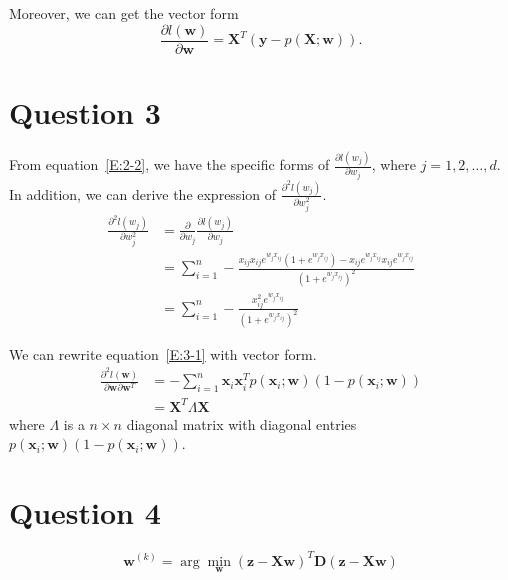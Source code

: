 \documentclass{article}
\newcommand{\vecw}{\mathbf{w}}
\newcommand{\vecx}{\mathbf{x}}
\newcommand{\vecy}{\mathbf{y}}
\newcommand{\vecz}{\mathbf{z}}
\newcommand{\matx}{\mathbf{X}}
\newcommand{\matd}{\mathbf{D}}
\newcommand{\partialdd}[2]{\frac{\partial #1}{\partial #2}}
\begin{document}
Moreover, we can get the vector form
\begin{equation}\label{E:2-3}
    \partialdd{l(\vecw)}{\vecw} = \matx^T\left(\vecy-p(\matx;\vecw)\right).
\end{equation}


\section{Question 3}\label{S:3}
From equation~\eqref{E:2-2}, we have the specific forms of $\partialdd{l(w_j)}{w_j}$, where $j=1,2,\ldots,d$. In addition, we can derive the expression of $\partialdd{^2l(w_j)}{w_j^2}$.
\begin{equation}\label{E:3-1}
    \begin{aligned}
        \partialdd{^2l(w_j)}{w_j^2} &= \partialdd{}{w_j}\partialdd{l(w_j)}{w_j} \\
                                    &= \sum_{i=1}^n-\frac{x_{ij}x_{ij}e^{w_jx_{ij}}\left(1+e^{w_jx_{ij}}\right)-x_{ij}e^{w_jx_{ij}}x_{ij}e^{w_jx_{ij}}}{\left(1+e^{w_jx_{ij}}\right)^2} \\
                                    &= \sum_{i=1}^n-\frac{x_{ij}^2e^{w_jx_{ij}}}{\left(1+e^{w_jx_{ij}}\right)^2}
    \end{aligned}
\end{equation}

We can rewrite equation~\eqref{E:3-1} with vector form.
\begin{equation}\label{E:3-2}
    \begin{aligned}
        \partialdd{^2l(\vecw)}{\vecw\partial\vecw^T} &= -\sum_{i=1}^n\vecx_i\vecx_i^Tp\left(\vecx_i;\vecw\right)\left(1-p(\vecx_i;\vecw)\right) \\
                                                     &= \matx^T\Lambda\matx
    \end{aligned}
\end{equation}
where $\Lambda$ is a $n\times n$ diagonal matrix with diagonal entries $p\left(\vecx_i;\vecw\right)\left(1-p(\vecx_i;\vecw)\right)$.


\section{Question 4}\label{S:4}
\begin{equation}\label{E:4-1}
    \vecw^{(k)} = \arg\min_{\vecw}(\vecz-\matx\vecw)^T\matd(\vecz-\matx\vecw)
\end{equation}
\end{document}
